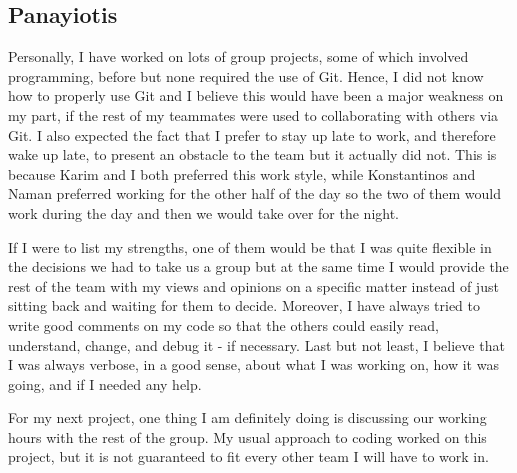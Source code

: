 \documentclass{article}
\begin{document}
\subsection{Panayiotis}
Personally, I have worked on lots of group projects, some of which involved programming, before but none required the use of Git. Hence, I did not know how to properly use Git and I believe this would have been a major weakness on my part, if the rest of my teammates were used to collaborating with others via Git. I also expected the fact that I prefer to stay up late to work, and therefore wake up late, to present an obstacle to the team but it actually did not. This is because Karim and I both preferred this work style, while Konstantinos and Naman preferred working for the other half of the day so the two of them would work during the day and then we would take over for the night.\\ \par \noindent
If I were to list my strengths, one of them would be that I was quite flexible in the decisions we had to take us a group but at the same time I would provide the rest of the team with my views and opinions on a specific matter instead of just sitting back and waiting for them to decide. Moreover, I have always tried to write good comments on my code so that the others could easily read, understand, change, and debug it - if necessary. Last but not least, I believe that I was always verbose, in a good sense, about what I was working on, how it was going, and if I needed any help.\\ \par \noindent
For my next project, one thing I am definitely doing is discussing our working hours with the rest of the group. My usual approach to coding worked on this project, but it is not guaranteed to fit every other team I will have to work in.\\ \par \noindent

\end{document}
